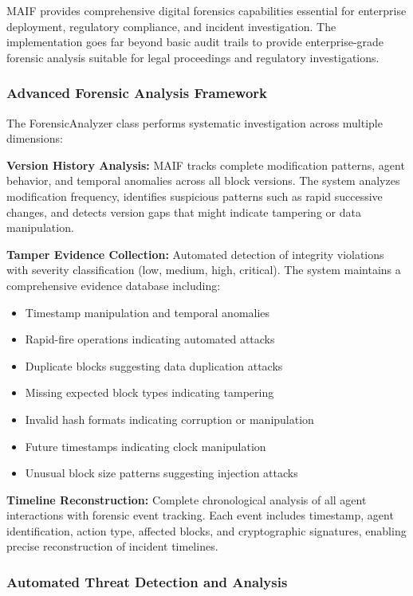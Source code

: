 \documentclass[conference]{IEEEtran}
\begin{document}
MAIF provides comprehensive digital forensics capabilities essential for enterprise deployment, regulatory compliance, and incident investigation. The implementation goes far beyond basic audit trails to provide enterprise-grade forensic analysis suitable for legal proceedings and regulatory investigations.

\subsubsection{Advanced Forensic Analysis Framework}

The ForensicAnalyzer class performs systematic investigation across multiple dimensions:

\textbf{Version History Analysis:} MAIF tracks complete modification patterns, agent behavior, and temporal anomalies across all block versions. The system analyzes modification frequency, identifies suspicious patterns such as rapid successive changes, and detects version gaps that might indicate tampering or data manipulation.

\textbf{Tamper Evidence Collection:} Automated detection of integrity violations with severity classification (low, medium, high, critical). The system maintains a comprehensive evidence database including:
\begin{itemize}[leftmargin=*]
\item Timestamp manipulation and temporal anomalies
\item Rapid-fire operations indicating automated attacks
\item Duplicate blocks suggesting data duplication attacks
\item Missing expected block types indicating tampering
\item Invalid hash formats indicating corruption or manipulation
\item Future timestamps indicating clock manipulation
\item Unusual block size patterns suggesting injection attacks
\end{itemize}

\textbf{Timeline Reconstruction:} Complete chronological analysis of all agent interactions with forensic event tracking. Each event includes timestamp, agent identification, action type, affected blocks, and cryptographic signatures, enabling precise reconstruction of incident timelines.

\subsubsection{Automated Threat Detection and Analysis}
\end{document}
